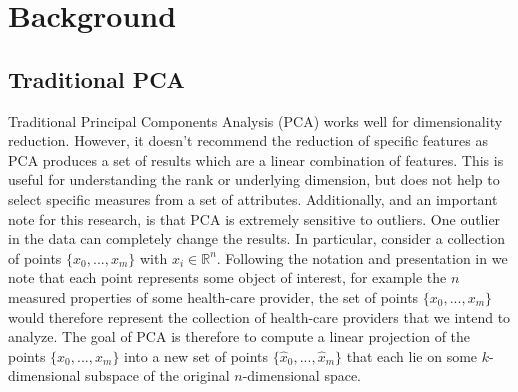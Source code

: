 \documentclass[conference]{IEEEtran}
\begin{document}


\section{Background}
\subsection{Traditional PCA} \label{PCA}
Traditional Principal Components Analysis (PCA) works well for dimensionality reduction.  However, it doesn't recommend the reduction of specific features as   PCA produces a set of results which are a linear combination of features.  This is useful for understanding the rank or underlying dimension, but does not help to select specific measures from a set of attributes. Additionally, and an important note for this research, is that PCA is extremely sensitive to outliers.  One outlier in the data can completely change the results.
In particular, consider a collection of
points $\{x_0,...,x_m\}$ with $x_i \in \mathbb{R}^n$.  Following the notation and presentation in \cite{paffenroth2018robust} we note that each point represents some object of interest, for example the $n$ measured properties of some health-care provider, the set of points $\{x_0,...,x_m\}$ would therefore
represent the collection of health-care providers that we intend to analyze.
The goal of PCA is therefore to compute a linear projection of the points $\{x_0,...,x_m\}$ into a new
set of points $\{\hat{x}_0,...,\hat{x}_m\}$ that each lie on some $k$-dimensional subspace of the original
$n$-dimensional space.  
\end{document}

